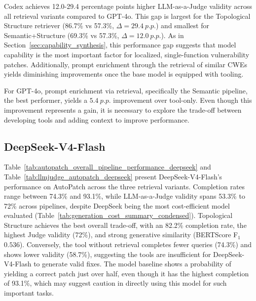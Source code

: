 

Codex achieves 12.0-29.4 percentage points higher LLM-as-a-Judge validity across all retrieval variants compared to GPT-4o. This gap is largest for the Topological Structure retriever (86.7\% vs 57.3\%, $\Delta=29.4~p.p.$) and smallest for Semantic+Structure (69.3\% vs 57.3\%, $\Delta=12.0~p.p.$). 
As in Section~\ref{sec:capability_synthesis}, this performance gap suggests that model capability is the most important factor for localized, single-function vulnerability patches. Additionally, prompt enrichment through the retrieval of similar CWEs yields diminishing improvements once the base model is equipped with tooling.

For GPT-4o, prompt enrichment via retrieval, specifically the Semantic pipeline, the best performer, yields a $5.4~p.p.$ improvement over tool-only. Even though this improvement represents a gain, it is necessary to explore the trade-off between developing tools and adding context to improve performance.

\subsection{DeepSeek-V4-Flash}
Table~\ref{tab:autopatch_overall_pipeline_performance_deepseek} and Table~\ref{tab:llmjudge_autopatch_deepseek} present DeepSeek-V4-Flash's performance on AutoPatch across the three retrieval variants. Completion rates range between 74.3\% and 93.1\%, while LLM-as-a-Judge validity spans 53.3\% to 72\% across pipelines, despite DeepSeek being the most cost-efficient model evaluated (Table~\ref{tab:generation_cost_summary_condensed}). Topological Structure achieves the best overall trade-off, with an 82.2\% completion rate, the highest Judge validity (72\%), and strong generative similarity (BERTScore F$_1$ $0.536$). Conversely, the tool without retrieval completes fewer queries (74.3\%) and shows lower validity (58.7\%), suggesting the tools are insufficient for DeepSeek-V4-Flash to generate valid fixes. The model baseline shows a probability of yielding a correct patch just over half, even though it has the highest completion of 93.1\%, which may suggest caution in directly using this model for such important tasks.


